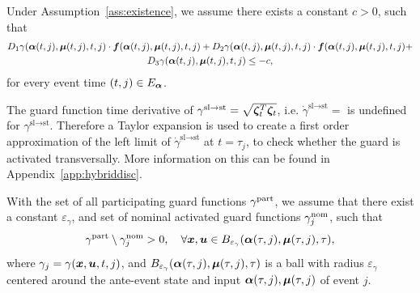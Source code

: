 \documentclass[../DC2017114Bouma.tex]{subfiles}
\begin{document}
\begin{myass}\label{ass:transversality}
Under Assumption~\ref{ass:existence}, we assume there exists a constant $c>0$, such that
\begin{multline}
D_1\gamma(\boldsymbol{\alpha}(t,j),\boldsymbol{\mu}(t,j),t,j)\cdot{\boldsymbol{f}}(\boldsymbol{\alpha}(t,j),\boldsymbol{\mu}(t,j),t,j) + D_2\gamma(\boldsymbol{\alpha}(t,j),\boldsymbol{\mu}(t,j),t,j)\cdot{\boldsymbol{f}}(\boldsymbol{\alpha}(t,j),\boldsymbol{\mu}(t,j),t,j) +\\ D_3\gamma(\boldsymbol{\alpha}(t,j),\boldsymbol{\mu}(t,j),t,j) \leq -c,
\end{multline}
for every event time $(t,j) \in E_{\boldsymbol{\alpha}}$.
\end{myass}

\begin{myremark}
The guard function time derivative of $\gamma^{\text{sl}\rightarrow\text{st}} = \sqrt{\boldsymbol{\zeta}_t^T\boldsymbol{\zeta}_t}$, i.e. $\dot{\gamma}^{\text{sl}\rightarrow\text{st}} = $ is undefined for $\gamma^{\text{sl}\rightarrow\text{st}}$. Therefore a Taylor expansion is used to create a first order approximation of the left limit of $\dot{\gamma}^{\text{sl}\rightarrow\text{st}}$ at $t = \tau_j$, to check whether the guard is activated transversally. More information on this can be found in Appendix~\ref{app:hybriddisc}. 
\end{myremark}

\begin{myass}\label{ass:guardeventpair}
With the set of all participating guard functions $\gamma^{\textnormal{part}}$, we assume that there exist a constant $\varepsilon_\gamma$, and set of nominal activated guard functions $\gamma^{\textnormal{nom}}_j$, such that
\begin{align}
\gamma^{\textnormal{part}}\setminus\gamma^{\textnormal{nom}}_j > 0,\quad \forall {\boldsymbol{x}},{\boldsymbol{u}}\in B_{\varepsilon_\gamma}(\boldsymbol{\alpha}(\tau,j),\boldsymbol{\mu}(\tau,j),\tau),
\end{align}
where $\gamma_j = \gamma({\boldsymbol{x}},{\boldsymbol{u}},t,j)$, and $B_{\varepsilon_\gamma}(\boldsymbol{\alpha}(\tau,j),\boldsymbol{\mu}(\tau,j),\tau)$ is a ball with radius $\varepsilon_{\gamma}$ centered around the ante-event state and input $\boldsymbol{\alpha}(\tau,j),\boldsymbol{\mu}(\tau,j)$ of event $j$.
\end{myass}
\end{document}
